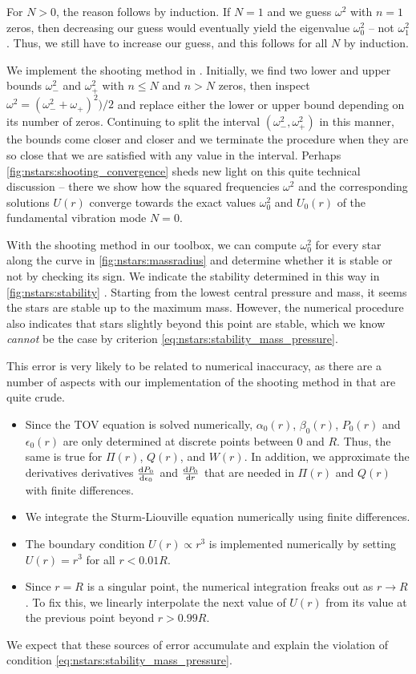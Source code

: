 For $N > 0$, the reason follows by induction.
If $N = 1$ and we guess $\omega^2$ with $n = 1$ zeros, then decreasing our guess would eventually yield the eigenvalue $\omega_0^2$ -- not $\omega_1^2$.
Thus, we still have to increase our guess, and this follows for all $N$ by induction.

We implement the shooting method in .
Initially, we find two lower and upper bounds $\omega_-^2$ and $\omega_+^2$ with $n \leq N$ and $n > N$ zeros, then inspect $\omega^2 = (\omega_-^2 + \omega_+)^2) / 2$ and replace either the lower or upper bound depending on its number of zeros.
Continuing to split the interval $(\omega_-^2, \omega_+^2)$ in this manner, the bounds come closer and closer and we terminate the procedure when they are so close that we are satisfied with any value in the interval.
Perhaps \cref{fig:nstars:shooting_convergence} sheds new light on this quite technical discussion -- there we show how the squared frequencies $\omega^2$ and the corresponding solutions $U(r)$ converge towards the exact values $\omega_0^2$ and $U_0(r)$ of the fundamental vibration mode $N=0$.

With the shooting method in our toolbox, we can compute $\omega_0^2$ for every star along the curve in \cref{fig:nstars:massradius} and determine whether it is stable or not by checking its sign.
We indicate the stability determined in this way in \cref{fig:nstars:stability} .
Starting from the lowest central pressure and mass, it seems the stars are stable up to the maximum mass.
However, the numerical procedure also indicates that stars slightly beyond this point are stable, which we know \emph{cannot} be the case by criterion \eqref{eq:nstars:stability_mass_pressure}.

This error is very likely to be related to numerical inaccuracy, as there are a number of aspects with our implementation of the shooting method in  that are quite crude.
\begin{itemize}
\item Since the TOV equation is solved numerically, $\alpha_0(r)$, $\beta_0(r)$, $P_0(r)$ and $\epsilon_0(r)$ are only determined at discrete points between $0$ and $R$.
      Thus, the same is true for $\Pi(r)$, $Q(r)$, and $W(r)$.
      In addition, we approximate the derivatives derivatives $\odv{P_0}{\epsilon_0}$ and $\odv{P_0}{r}$ that are needed in $\Pi(r)$ and $Q(r)$ with finite differences.
\item We integrate the Sturm-Liouville equation numerically using finite differences.
\item The boundary condition $U(r) \propto r^3$ is implemented numerically by setting $U(r) = r^3$ for all $r < 0.01 R$.
\item Since $r=R$ is a singular point, the numerical integration freaks out as $r \rightarrow R$.
      To fix this, we linearly interpolate the next value of $U(r)$ from its value at the previous point beyond $r > 0.99 R$.
\end{itemize}
We expect that these sources of error accumulate and explain the violation of condition \eqref{eq:nstars:stability_mass_pressure}.

